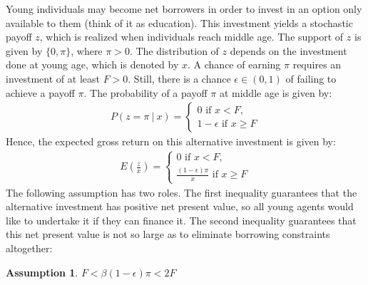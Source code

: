 \documentclass[draft,pdftex,nolinenumbers,noinfoline]{article}
\theoremstyle{plain}
\newtheorem{Assump}{Assumption}
\begin{document}
Young individuals may become net borrowers in order to invest in an option only available to them (think of it as education). This investment yields a stochastic payoff $z$, which is realized when individuals reach middle age. The support of $z$ is given by $\{0,\pi\}$, where $\pi>0$. The distribution of $z$ depends on the investment done at young age, which is denoted by $x$. A chance of earning $\pi$ requires an investment of at least $F>0$. Still, there is a chance $\epsilon\in(0,1)$ of failing to achieve a payoff $\pi$.
The probability of a payoff $\pi$ at middle age is given by:
\begin{align}\label{eq:zdist}
P(z = \pi \ |  \ x) = \begin{cases} 0 \text{ if } x<F , \\
1-\epsilon \text{ if } x\geq F \end{cases}
\end{align}
Hence, the expected gross return on this alternative investment is given by:
\begin{align}
E\left(\frac{z}{x}\right) = 
\begin{cases} 
0 \text{ if } x<F , \\
\frac{(1-\epsilon)\pi}{x} \text{ if } x\geq F
\end{cases}
\end{align}
The following assumption has two roles. The first inequality guarantees that the alternative investment has positive net present value, so all young agents would like to undertake it if they can finance it. The second inequality guarantees that this net present value is not so large as to eliminate borrowing constraints altogether:
\begin{Assump}\label{Assump1}
$F<\beta(1-\epsilon)\pi < 2F$
\end{Assump}
\end{document}
